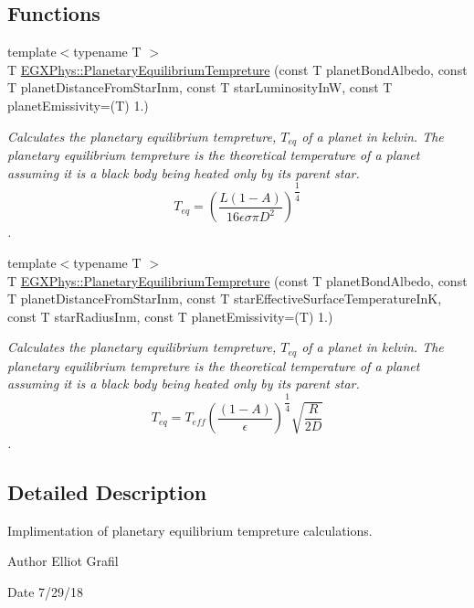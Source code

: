 \subsection*{Functions}
\begin{DoxyCompactItemize}
\item 
{\footnotesize template$<$typename T $>$ }\\T \mbox{\hyperlink{group___e_g_x_phys-_astrophysics-_planetary_equilibrium_tempreture_ga48b1c3c35c18036586685da25085d05b}{E\+G\+X\+Phys\+::\+Planetary\+Equilibrium\+Tempreture}} (const T planet\+Bond\+Albedo, const T planet\+Distance\+From\+Star\+Inm, const T star\+Luminosity\+InW, const T planet\+Emissivity=(T) 1.)
\begin{DoxyCompactList}\small\item\em Calculates the planetary equilibrium tempreture, $T_{eq}$ of a planet in kelvin. The planetary equilibrium tempreture is the theoretical temperature of a planet assuming it is a black body being heated only by its parent star. \[ T_{eq}=\left ( \dfrac{L (1-A)}{16 \epsilon \sigma \pi D^2} \right )^{\dfrac{1}{4}} \]. \end{DoxyCompactList}\item 
{\footnotesize template$<$typename T $>$ }\\T \mbox{\hyperlink{group___e_g_x_phys-_astrophysics-_planetary_equilibrium_tempreture_ga4a6704ad5d483e07453bcd01ba5f66c3}{E\+G\+X\+Phys\+::\+Planetary\+Equilibrium\+Tempreture}} (const T planet\+Bond\+Albedo, const T planet\+Distance\+From\+Star\+Inm, const T star\+Effective\+Surface\+Temperature\+InK, const T star\+Radius\+Inm, const T planet\+Emissivity=(T) 1.)
\begin{DoxyCompactList}\small\item\em Calculates the planetary equilibrium tempreture, $T_{eq}$ of a planet in kelvin. The planetary equilibrium tempreture is the theoretical temperature of a planet assuming it is a black body being heated only by its parent star. \[ T_{eq}=T_{eff} \left ( \dfrac{(1-A)}{\epsilon} \right )^{\dfrac{1}{4}} \sqrt{\dfrac{R}{2 D}} \]. \end{DoxyCompactList}\end{DoxyCompactItemize}


\subsection{Detailed Description}
Implimentation of planetary equilibrium tempreture calculations. 

\begin{DoxyAuthor}{Author}
Elliot Grafil 
\end{DoxyAuthor}
\begin{DoxyDate}{Date}
7/29/18 
\end{DoxyDate}
